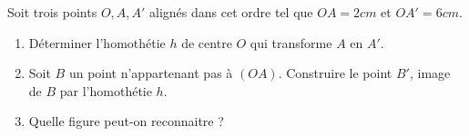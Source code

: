 
Soit trois points $O, A, A'$ alignés dans cet ordre tel que $OA = 2 cm$ et $OA' = 6 cm$.
\begin{enumerate}
\item Déterminer l'homothétie $h$ de centre $O$ qui transforme $A$ en $A'$.
\item Soit $B$ un point n'appartenant pas à $(OA)$. Construire le point $B'$, image de $B$ par l'homothétie $h$.
\item Quelle figure peut-on reconnaitre ?
\end{enumerate}

